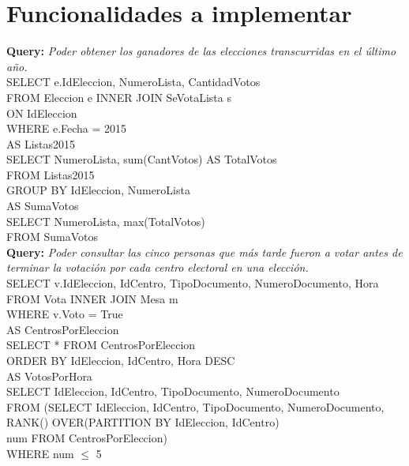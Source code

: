 \documentclass[10pt,a4paper]{article}
\begin{document}

\newpage
\section{Funcionalidades a implementar}

\textbf{Query:} \textit{Poder obtener los ganadores de las elecciones transcurridas en el último año.}\\

SELECT e.IdEleccion, NumeroLista, CantidadVotos\\
FROM Eleccion e INNER JOIN SeVotaLista s\\
ON IdEleccion\\
WHERE e.Fecha = 2015\\ %
AS Listas2015\\

SELECT NumeroLista, sum(CantVotos) AS TotalVotos\\
FROM Listas2015\\
GROUP BY IdEleccion, NumeroLista\\
AS SumaVotos\\

SELECT NumeroLista, max(TotalVotos)\\
FROM SumaVotos\\

\textbf{Query:} \textit{Poder consultar las cinco personas que más tarde fueron a votar antes de terminar la votación por cada centro electoral en una elección.}\\

SELECT v.IdEleccion, IdCentro, TipoDocumento, NumeroDocumento, Hora\\
FROM Vota INNER JOIN Mesa m\\
WHERE v.Voto = True\\
AS CentrosPorEleccion\\

SELECT * FROM CentrosPorEleccion\\
ORDER BY IdEleccion, IdCentro, Hora DESC\\
AS VotosPorHora\\

SELECT IdEleccion, IdCentro, TipoDocumento, NumeroDocumento\\
FROM (SELECT IdEleccion, IdCentro, TipoDocumento, NumeroDocumento, RANK() OVER(PARTITION BY IdEleccion, IdCentro)\\
num FROM CentrosPorEleccion)\\
WHERE num $\leq$ 5\\
\end{document}
